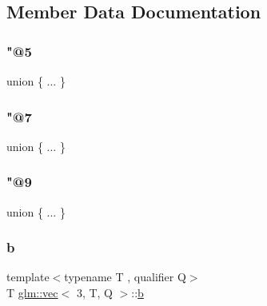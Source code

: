 \subsection{Member Data Documentation}
\mbox{\label{structglm_1_1vec_3_013_00_01_t_00_01_q_01_4_ada7288ef08e728dad196122ef5a24bc1}} 
\subsubsection{\texorpdfstring{"@5}{@5}}
{\footnotesize\ttfamily union \{ ... \} }

\mbox{\label{structglm_1_1vec_3_013_00_01_t_00_01_q_01_4_a3c73a68759d50909386cae51952769cf}} 
\subsubsection{\texorpdfstring{"@7}{@7}}
{\footnotesize\ttfamily union \{ ... \} }

\mbox{\label{structglm_1_1vec_3_013_00_01_t_00_01_q_01_4_a7d1b40636c9a66a087f10e0abf601990}} 
\subsubsection{\texorpdfstring{"@9}{@9}}
{\footnotesize\ttfamily union \{ ... \} }

\mbox{\label{structglm_1_1vec_3_013_00_01_t_00_01_q_01_4_a3bec3aae8fdbe58bc4a6354285609050}} 
\subsubsection{\texorpdfstring{b}{b}}
{\footnotesize\ttfamily template$<$typename T , qualifier Q$>$ \\
T \hyperlink{structglm_1_1vec}{glm\+::vec}$<$ 3, T, Q $>$\+::\hyperlink{_s_d_l__opengl__glext_8h_a0f71581a41fd2264c8944126dabbd010}{b}}

\mbox{\label{structglm_1_1vec_3_013_00_01_t_00_01_q_01_4_aa01fb9a90b9b739797a0f1ca96206570}} 
